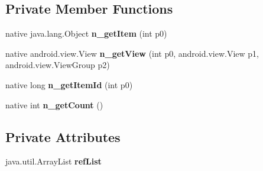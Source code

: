 \subsection*{Private Member Functions}
\begin{DoxyCompactItemize}
\item 
\mbox{\label{classmd5b60ffeb829f638581ab2bb9b1a7f4f3f_1_1NavigationMenuRenderer__MenuAdapter_acdf5437d44dbba53f13ac26a1a966d0b}} 
native java.\+lang.\+Object {\bfseries n\+\_\+get\+Item} (int p0)
\item 
\mbox{\label{classmd5b60ffeb829f638581ab2bb9b1a7f4f3f_1_1NavigationMenuRenderer__MenuAdapter_a09dc2f9b7fa0c5d8875fb553e7b4ec3b}} 
native android.\+view.\+View {\bfseries n\+\_\+get\+View} (int p0, android.\+view.\+View p1, android.\+view.\+View\+Group p2)
\item 
\mbox{\label{classmd5b60ffeb829f638581ab2bb9b1a7f4f3f_1_1NavigationMenuRenderer__MenuAdapter_ab8f31e976ee1157cae0abf1c24e7f7c2}} 
native long {\bfseries n\+\_\+get\+Item\+Id} (int p0)
\item 
\mbox{\label{classmd5b60ffeb829f638581ab2bb9b1a7f4f3f_1_1NavigationMenuRenderer__MenuAdapter_a64491c97bb50745245d20353a99d088d}} 
native int {\bfseries n\+\_\+get\+Count} ()
\end{DoxyCompactItemize}
\subsection*{Private Attributes}
\begin{DoxyCompactItemize}
\item 
\mbox{\label{classmd5b60ffeb829f638581ab2bb9b1a7f4f3f_1_1NavigationMenuRenderer__MenuAdapter_a816f51fd01db11b07020f12e0694cf61}} 
java.\+util.\+Array\+List {\bfseries ref\+List}
\end{DoxyCompactItemize}


